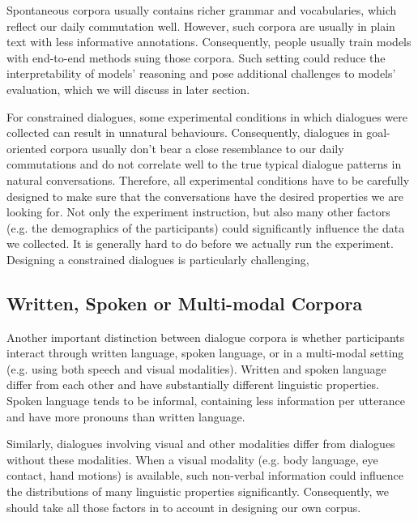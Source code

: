 \documentclass[bsc,frontabs,twoside,singlespacing,parskip,deptreport]{infthesis}     %
\begin{document}
Spontaneous corpora usually contains richer grammar and vocabularies, which reflect our daily commutation well. However, such corpora are usually in plain text with less informative annotations. Consequently, people usually train models with end-to-end methods suing those corpora. Such setting could reduce the interpretability of models' reasoning and pose additional challenges to models' evaluation, which we will discuss in later section. 

For constrained dialogues, some experimental conditions in which dialogues were collected can result in unnatural behaviours. Consequently, dialogues in goal-oriented corpora usually don't bear a close resemblance to our daily commutations and do not correlate well to the true typical dialogue patterns in natural conversations. Therefore, all experimental conditions have to be carefully designed to make sure that the conversations have the desired properties we are looking for. Not only the experiment instruction, but also many other factors (e.g. the demographics of the participants\cite{ai2007comparing,young2013pomdp}) could significantly influence the data we collected. It is generally hard to do before we actually run the experiment. Designing a constrained dialogues is particularly challenging, 

\subsection{Written, Spoken or Multi-modal Corpora}

Another important distinction between dialogue corpora is whether participants interact through written language, spoken language, or in a multi-modal setting (e.g. using both speech and visual modalities). Written and spoken language differ from each other and have substantially different linguistic properties. Spoken language tends to be informal, containing less information per utterance and have more pronouns than written language\cite{carter2006cambridge,biber2001diachronic}.

Similarly, dialogues involving visual and other modalities differ from dialogues without these modalities\cite{serban2015survey,duncan1983charles}. When a visual modality (e.g. body language, eye contact, hand motions) is available, such non-verbal information could influence the distributions of many linguistic properties significantly\cite{gibson1963perception,lord1974perception,cooper1974control,chartrand1999chameleon,de2013speaker}. Consequently, we should take all those factors in to account in designing our own corpus.
\end{document}

